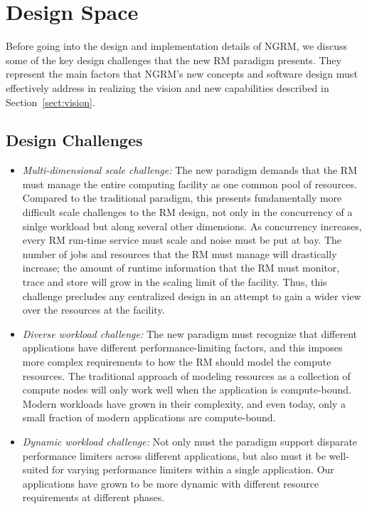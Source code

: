 \documentclass{article}
\newcommand{\ngrm}{NGRM}
\begin{document}
\section{Design Space}

Before going into the design and implementation details of \ngrm, we discuss 
some of the key design challenges that the new RM paradigm presents. 
They represent the main factors that \ngrm's new concepts and software design
must effectively address in realizing the vision and new capabilities described in 
Section~\ref{sect:vision}. 

\subsection{Design Challenges}

\begin{itemize}
\item{\sl Multi-dimensional scale challenge:} The new paradigm demands that 
      the RM must manage the entire computing facility as one common pool of 
      resources. Compared to the traditional paradigm, this presents 
      fundamentally more difficult scale challenges to the RM design,
      not only in the concurrency of a sinlge workload but along
      several other dimensions. As concurrency increases, every RM run-time
      service must scale and noise must be put at bay.  
      The number of jobs and resources 
      that the RM must manage will drastically increase; the amount 
      of runtime information that the RM must monitor, trace and store 
      will grow in the scaling limit of the facility.
      Thus, this challenge precludes any centralized design in an attempt to 
      gain a wider view over the resources at the facility. 

\item{\sl Diverse workload challenge:} The new paradigm must recognize that
      different applications have different performance-limiting factors,
      and this imposes more complex requirements to how the RM should
      model the compute resources. The traditional approach of modeling 
      resources as a collection of compute nodes will only work well when the
      application is compute-bound. Modern workloads have grown in their
      complexity, and even today, only a small fraction of modern applications
      are compute-bound.
       
\item{\sl Dynamic workload challenge:} Not only must the paradigm support 
      disparate performance limiters across different applications, but
      also must it be well-suited for varying performance limiters within 
      a single application. Our applications have grown to be more
      dynamic with different resource requirements at different
      phases.


\end{itemize}
\end{document}
